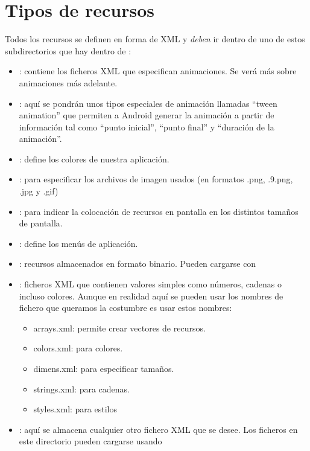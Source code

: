 \documentclass[a4paper,12pt,spanish]{sphinxmanual}
\begin{document}
\section{Tipos de recursos}
\label{tema1:tipos-de-recursos}
Todos los recursos se definen en forma de XML y \emph{deben} ir dentro de uno de estos subdirectorios que hay dentro de :
\begin{itemize}
\item {} 
: contiene los ficheros XML que especifican animaciones. Se verá más sobre animaciones más adelante.

\item {} 
: aquí se pondrán unos tipos especiales de animación llamadas ``tween animation'' que permiten a Android generar la animación a partir de información tal como ``punto inicial'', ``punto final'' y ``duración de la animación''.

\item {} 
: define los colores de nuestra aplicación.

\item {} 
: para especificar los archivos de imagen usados (en formatos .png, .9.png, .jpg y .gif)

\item {} 
: para indicar la colocación de recursos en pantalla en los distintos tamaños de pantalla.

\item {} 
: define los menús de aplicación.

\item {} 
: recursos almacenados en formato binario. Pueden cargarse con 

\item {} 
: ficheros XML que contienen valores simples como números, cadenas o incluso colores. Aunque en realidad aquí se pueden usar los nombres de fichero que queramos la costumbre es usar estos nombres:
\begin{itemize}
\item {} 
arrays.xml: permite crear vectores de recursos.

\item {} 
colors.xml: para colores.

\item {} 
dimens.xml: para especificar tamaños.

\item {} 
strings.xml: para cadenas.

\item {} 
styles.xml: para estilos

\end{itemize}

\item {} 
: aquí se almacena cualquier otro fichero XML que se desee. Los ficheros en este directorio pueden cargarse usando 

\end{itemize}
\end{document}
